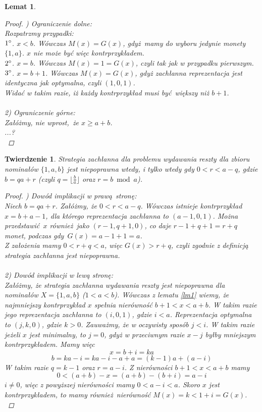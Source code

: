 \documentclass[12pt]{article}
\newtheorem*{theorem*}{Twierdzenie}
\newtheorem{lemma}{Lemat}
\begin{document}
\begin{titlepage}
\begin{lemma}
\begin{proof}$ $) Ograniczenie dolne:\\
Rozpatrzmy przypadki:\\
$1\degree$. $x < b$. Wówczas $M(x) = G(x)$, gdyż mamy do
wyboru jedynie monety $\{1, a\}$. $x$ nie może być więc kontrprzykładem.\\
$2\degree$. $x = b$. Wówczas $M(x) = 1 = G(x)$, czyli tak jak w przypadku pierwszym.\\
$3\degree$. $x = b + 1 $. Wówczas $M(x) = G(x)$, gdyż zachłanna reprezentacja jest
identyczna jak optymalna, czyli $(1, 0, 1)$.\\
Widać w takim razie, iż każdy kontrprzykład musi być większy niż $b + 1$.\\\\
2) Ograniczenie górne:\\
Załóżmy, nie wprost, że $x \geq a + b$.
\\...?\\
\end{proof}
\end{lemma}


\begin{theorem*}\normalfont
Strategia zachłanna dla problemu wydawania reszty dla zbioru nominałów 
$\{1, a, b\}$ jest niepoprawna wtedy, i tylko wtedy gdy $0 < r < a - q$,
gdzie $b = qa + r$ (czyli $q = \lfloor \frac{b}{a} \rfloor$ oraz $r = b \bmod a$).

\begin{proof}$ $) Dowód implikacji w prawą stronę:\\
Niech $b = qa + r$. Załóżmy, że $0 < r < a - q$. Wówczas istnieje
kontrprzykład $x = b + a - 1$, dla którego reprezentacja zachłanna to $(a - 1, 0, 1)$.
Można przedstawić $x$ również jako $(r - 1, q + 1, 0)$, co daje $r-1+q+1=r+q$ monet,
podczas gdy $G(x) = a - 1 + 1 = a$.\\
Z założenia mamy $0 < r + q < a$, więc $G(x) > r+q$, czyli zgodnie z definicją
strategia zachłanna jest niepoprawna.\\\\
2) Dowód implikacji w lewą stronę:\\
Załóżmy, że strategia zachłanna wydawania reszty jest niepoprawna dla nominałów
$X = \{1, a, b\}$ ($1 < a < b$). Wówczas z lematu \ref{lm1} wiemy, że najmniejszy
kontrprzykład $x$ spełnia nierówność $b + 1 < x < a + b$. W takim razie jego 
reprezentacja zachłanna to $(i, 0, 1)$, gdzie $i < a$. Reprezentacja optymalna
to $(j, k, 0)$, gdzie $k > 0$. Zauważmy, że w oczywisty sposób $j < i$. 
W takim razie jeżeli $x$ jest minimalny, to $j = 0$, gdyż w przeciwnym 
razie $x - j$ byłby mniejszym kontrprzykładem.
Mamy więc
$$x = b + i = ka$$
$$b = ka - i = ka - i - a + a = (k-1)a + (a-i)$$
W takim razie $q = k - 1$ oraz $r = a - i$.
Z nierówności $b + 1 < x < a + b$ mamy
$$0 < (a + b) - x = (a + b) - (b + i) = a - i$$
$i \neq 0$, więc z powyższej nierówności mamy $0< a - i < a$.
Skoro $x$ jest kontrprzykładem, to mamy również nierówność 
$M(x) = k < 1 + i = G(x)$.\\


\end{proof}
\end{theorem*}
\end{titlepage}
\end{document}
